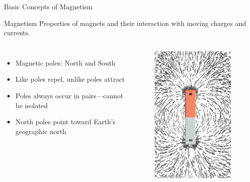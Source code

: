 \documentclass{beamer}
\begin{document}
\begin{frame}{Basic Concepts of Magnetism}
\begin{block}{Magnetism}
Properties of magnets and their interaction with moving charges and currents.
\end{block}

\begin{columns}
\begin{itemize}
\item Magnetic poles: North and South
\item Like poles repel, unlike poles attract
\item Poles always occur in pairs—cannot be isolated
\item North poles point toward Earth's geographic north
\end{itemize}

\begin{figure}
\centering
\includegraphics[width=0.8\linewidth]{mgng.png}
\end{figure}
\end{columns}
\end{frame}
\end{document}
